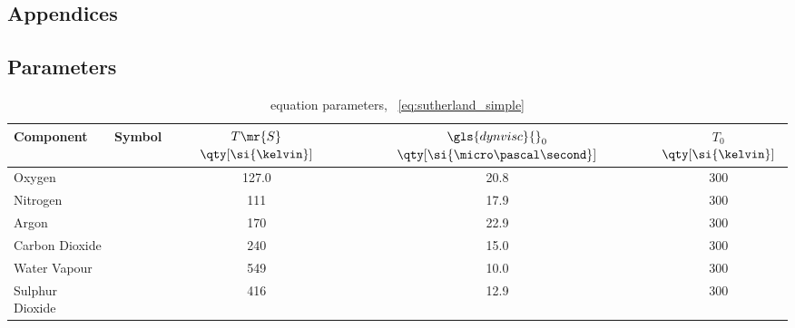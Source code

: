 
\begin{appendices}

\chapter{Appendices}\label{ch:appendices}

\section{Parameters}\label{ch:appendices_modelling}

\begin{table}[ht]
	\ttabbox
	{%
		\caption[Sutherland equation parameters]%
		{ equation parameters, \ \cref{eq:sutherland_simple}}
		\label{tab:sutherland}%
	}%
	{%
	\begin{tabular}{@{}lcc*2{S[table-format=2.1]}@{}}
		\toprule
		Component       &      Symbol       & {\(T\mr{S}\) \(\qty[\si{\kelvin}]\)} & {\(\gls{dynvisc}{}_0\)\mpfootnotemark[4] \(\qty[\si{\micro\pascal\second}]\)} & {\(T_0\)\mpfootnotemark[4] \(\qty[\si{\kelvin}]\)} \\ \midrule
		Oxygen          &         &       127.0\mpfootnotemark[1]        & 20.8                                                                          & 300                                                \\
		Nitrogen        &         &        111\mpfootnotemark[1]         & 17.9                                                                          & 300                                                \\
		Argon           &         &        170\mpfootnotemark[2]         & 22.9                                                                          & 300                                                \\
		Carbon Dioxide  &        &        240\mpfootnotemark[1]         & 15.0                                                                          & 300                                                \\
		Water Vapour    &  &        549\mpfootnotemark[3]         & 10.0                                                                          & 300                                                \\
		Sulphur Dioxide &        &        416\mpfootnotemark[1]         & 12.9                                                                          & 300                                                \\ \bottomrule
	\end{tabular}%
	}%
\end{table}%


\end{appendices}
